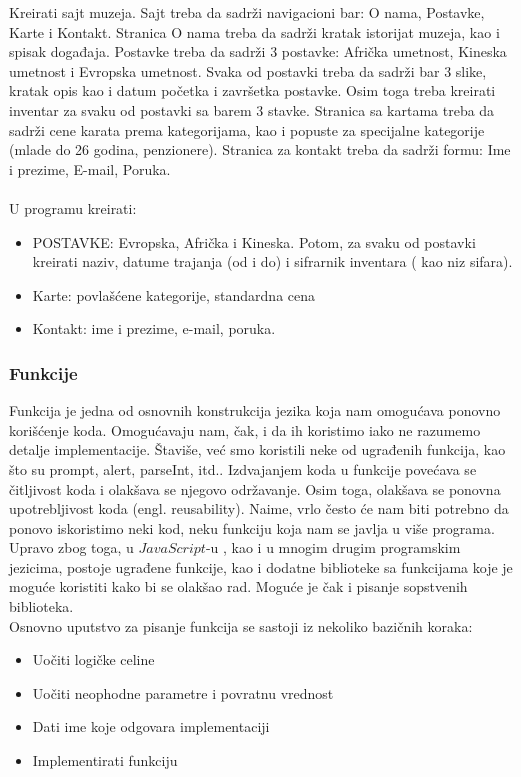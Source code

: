 \begin{primer}
Kreirati sajt muzeja. Sajt treba da sadrži navigacioni bar: O nama, Postavke, Karte i Kontakt. Stranica O nama treba da sadrži kratak istorijat muzeja, kao i spisak događaja. Postavke treba da sadrži 3 postavke: Afrička umetnost, Kineska umetnost i Evropska umetnost. Svaka od postavki treba da sadrži bar 3 slike, kratak opis kao i datum početka i završetka postavke. Osim toga treba kreirati inventar za svaku od postavki sa barem 3 stavke. Stranica sa kartama treba da sadrži cene karata prema kategorijama, kao i popuste za specijalne kategorije (mlade do 26 godina, penzionere). Stranica za kontakt treba da sadrži formu: Ime i prezime, E-mail, Poruka.\\\\
U programu kreirati:
\begin{itemize}
\item POSTAVKE: Evropska, Afrička i Kineska. Potom, za svaku od postavki kreirati naziv, datume trajanja (od i do) i sifrarnik inventara ( kao niz sifara).
\item Karte: povlašćene kategorije, standardna cena
\item Kontakt: ime i prezime, e-mail, poruka.
\end{itemize}  
\end{primer}
\newpage

\subsubsection{Funkcije}
Funkcija je jedna od osnovnih konstrukcija jezika koja nam omogućava ponovno korišćenje koda. Omogućavaju nam, čak, i da ih koristimo iako ne razumemo detalje implementacije. Štaviše, već smo koristili neke od ugrađenih funkcija, kao što su prompt, alert, parseInt, itd.. Izdvajanjem koda u funkcije povećava se čitljivost koda i olakšava se njegovo održavanje. Osim toga, olakšava se ponovna upotrebljivost koda (engl. reusability). Naime, vrlo često će nam biti potrebno da ponovo iskoristimo neki kod, neku funkciju koja nam se javlja u više programa. Upravo zbog toga, u $JavaScript$-u , kao i u mnogim drugim programskim jezicima, postoje ugrađene funkcije, kao i dodatne biblioteke sa funkcijama koje je moguće koristiti kako bi se olakšao rad. Moguće je čak i pisanje sopstvenih biblioteka.    
\\
Osnovno uputstvo za pisanje funkcija se sastoji iz nekoliko bazičnih koraka:
\begin{itemize}
\item Uočiti logičke celine
\item Uočiti neophodne parametre i povratnu vrednost 
\item Dati ime koje odgovara implementaciji
\item Implementirati funkciju
\end{itemize}

